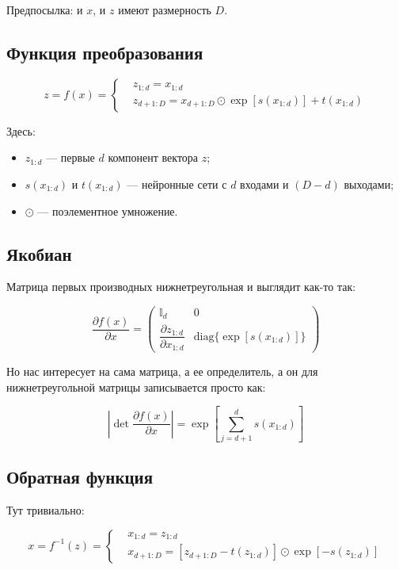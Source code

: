 Предпосылка: и $x$, и $z$ имеют размерность $D$.

\subsection{Функция преобразования}

\begin{equation}
	z = f(x) = 
		\begin{cases}
			&z_{1:d} = x_{1:d}\\
			&z_{d+1:D} = x_{d+1:D} \odot \exp[s(x_{1:d})] + t(x_{1:d}) 
		\end{cases}
\end{equation}

Здесь:

\begin{itemize}
	\item $z_{1:d}$ --- первые $d$ компонент вектора $z$;
	
	\item $s(x_{1:d})$ и $t(x_{1:d})$ --- нейронные сети с $d$ входами и $(D-d)$ выходами;
	
	\item $\odot$ --- поэлементное умножение.
\end{itemize}

\subsection{Якобиан}

Матрица первых производных нижнетреугольная и выглядит как-то так:

\begin{equation}
	\frac{\partial f(x)}{\partial x} = 
	\begin{pmatrix}
		\mathbb{I}_d & 0 \\
		\dfrac{\partial z_{1:d}}{\partial x_{1:d}}& \text{diag}\{\exp[s(x_{1:d})]\}
	\end{pmatrix}	
\end{equation}

Но нас интересует на сама матрица, а ее определитель, а он для нижнетреугольной матрицы записывается просто как:

\begin{equation}
	\left|\det \frac{\partial f(x)}{\partial x}\right| = \exp\left[\sum\limits_{j = d+1}^{d} s(x_{1:d})\right]
\end{equation}

\subsection{Обратная функция}

Тут тривиально:

\begin{equation}
	x = f^{-1}(z) = 
	\begin{cases}
		&x_{1:d} = z_{1:d}\\
		&x_{d+1:D} = [z_{d+1:D} - t(z_{1:d})] \odot \exp[-s(z_{1:d})]  
	\end{cases}
\end{equation}